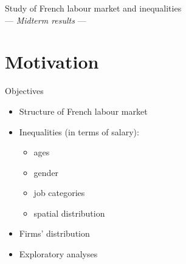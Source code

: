 \documentclass[xcolor=dvipsnames]{beamer}
\title[Topics in Statistical learning]{}
\author{L. Insolia, J. Kim and Y. Yeghikyan}
\institute{SNS}
\date{March 9, 2018}
\begin{document}
	
	\begin{frame}
		\vskip 1.5cm 	
 		\centering\huge\textcolor{bscuro}{Study of French labour market and inequalities} \\
		\vskip 0.5cm 
			\centering\small \textcolor{rscuro}{--- \emph{Midterm results} ---}
			\maketitle
	\end{frame}
	
	
	
\section{Motivation}
		\begin{frame}{\vskip 0.05cm\centerline{\Huge\textcolor{bscuro}{Objectives}}}
			
			\begin{itemize}
			 	 \item Structure of French labour market 
			 	 \item Inequalities (in terms of salary): 
			 	 \begin{itemize}
			 	 	\item ages 
			 	 	\item gender
			 	 	\item job categories
			 	 	\item spatial distribution
			 	 \end{itemize}
		 	 	 \item Firms' distribution
		 	 	 \item Exploratory analyses
			\end{itemize}
			\vskip 1cm
\end{frame}
	
	
\end{document}
